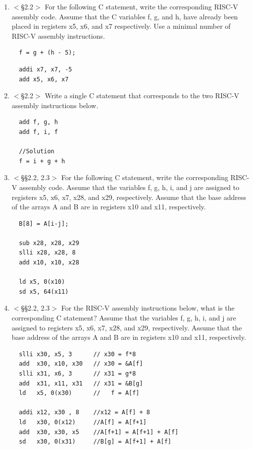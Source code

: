 \documentclass[11pt]{article}
\begin{document}
  \begin{enumerate}
    \item [2.1][5]$<$§2.2$>$ For the following C statement, write the corresponding RISC-V
assembly code. Assume that the C variables f, g, and h, have already been placed
in registers x5, x6, and x7 respectively. Use a minimal number of RISC-V assembly
instructions.
\begin{lstlisting}
  f = g + (h - 5);
\end{lstlisting}
\begin{lstlisting}
  addi x7, x7, -5
  add x5, x6, x7
\end{lstlisting}
\item [2.2][5] $<$§2.2$>$ Write a single C statement that corresponds to the two RISC-V
assembly instructions below.
\begin{lstlisting}
  add f, g, h
  add f, i, f

  //Solution
  f = i + g + h
\end{lstlisting}
\item [2.3][5] $<$§§2.2, 2.3$>$ For the following C statement, write the corresponding
RISC-V assembly code. Assume that the variables f, g, h, i, and j are assigned to
registers x5, x6, x7, x28, and x29, respectively. Assume that the base address
of the arrays A and B are in registers x10 and x11, respectively.
\begin{lstlisting}
  B[8] = A[i-j];

  sub x28, x28, x29
  slli x28, x28, 8
  add x10, x10, x28

  ld x5, 0(x10)
  sd x5, 64(x11)
\end{lstlisting}
\item [2.4][10] $<$§§2.2, 2.3$>$ For the RISC-V assembly instructions below, what is the
corresponding C statement? Assume that the variables f, g, h, i, and j are assigned
to registers x5, x6, x7, x28, and x29, respectively. Assume that the base
address of the arrays A and B are in registers x10 and x11, respectively.
\begin{lstlisting}
  slli x30, x5, 3      // x30 = f*8
  add  x30, x10, x30   // x30 = &A[f]
  slli x31, x6, 3      // x31 = g*8
  add  x31, x11, x31   // x31 = &B[g]
  ld   x5, 0(x30)      //   f = A[f]

  addi x12, x30 , 8    //x12 = A[f] + 8
  ld   x30, 0(x12)     //A[f] = A[f+1]
  add  x30, x30, x5    //A[f+1] = A[f+1] + A[f]
  sd   x30, 0(x31)     //B[g] = A[f+1] + A[f]


\end{lstlisting}
\end{enumerate}
\end{document}
